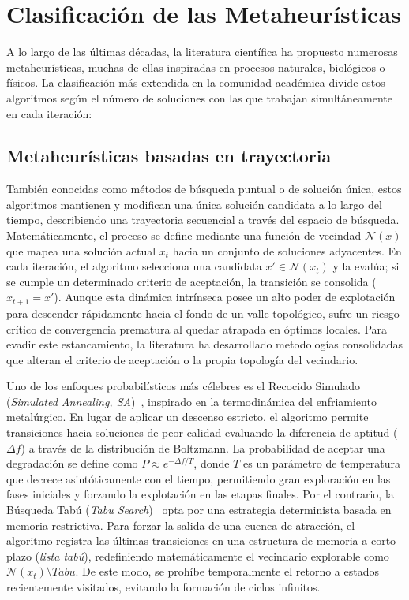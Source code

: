 \documentclass[12pt,a4paper,twoside,openright]{book}
\begin{document}
\section{Clasificación de las Metaheurísticas}

A lo largo de las últimas décadas, la literatura científica ha propuesto numerosas metaheurísticas, muchas de ellas inspiradas en procesos naturales, biológicos o físicos. La clasificación más extendida en la comunidad académica divide estos algoritmos según el número de soluciones con las que trabajan simultáneamente en cada iteración:


\subsection{Metaheurísticas basadas en trayectoria}
    También conocidas como métodos de búsqueda puntual o de solución única, estos algoritmos mantienen y modifican una única solución candidata a lo largo del tiempo, describiendo una trayectoria secuencial a través del espacio de búsqueda. Matemáticamente, el proceso se define mediante una función de vecindad $\mathcal{N}(x)$ que mapea una solución actual $x_t$ hacia un conjunto de soluciones adyacentes. En cada iteración, el algoritmo selecciona una candidata $x' \in \mathcal{N}(x_t)$ y la evalúa; si se cumple un determinado criterio de aceptación, la transición se consolida ($x_{t+1} = x'$). Aunque esta dinámica intrínseca posee un alto poder de explotación para descender rápidamente hacia el fondo de un valle topológico, sufre un riesgo crítico de convergencia prematura al quedar atrapada en óptimos locales. Para evadir este estancamiento, la literatura ha desarrollado metodologías consolidadas que alteran el criterio de aceptación o la propia topología del vecindario. 

    Uno de los enfoques probabilísticos más célebres es el Recocido Simulado (\textit{Simulated Annealing, SA})~\cite{kirkpatrick1983optimization}, inspirado en la termodinámica del enfriamiento metalúrgico. En lugar de aplicar un descenso estricto, el algoritmo permite transiciones hacia soluciones de peor calidad evaluando la diferencia de aptitud ($\Delta f$) a través de la distribución de Boltzmann. La probabilidad de aceptar una degradación se define como $P \approx e^{-\Delta f / T}$, donde $T$ es un parámetro de temperatura que decrece asintóticamente con el tiempo, permitiendo gran exploración en las fases iniciales y forzando la explotación en las etapas finales. Por el contrario, la Búsqueda Tabú (\textit{Tabu Search})~\cite{glover1986future} opta por una estrategia determinista basada en memoria restrictiva. Para forzar la salida de una cuenca de atracción, el algoritmo registra las últimas transiciones en una estructura de memoria a corto plazo (\textit{lista tabú}), redefiniendo matemáticamente el vecindario explorable como $\mathcal{N}(x_t) \setminus Tabu$. De este modo, se prohíbe temporalmente el retorno a estados recientemente visitados, evitando la formación de ciclos infinitos.
\end{document}
